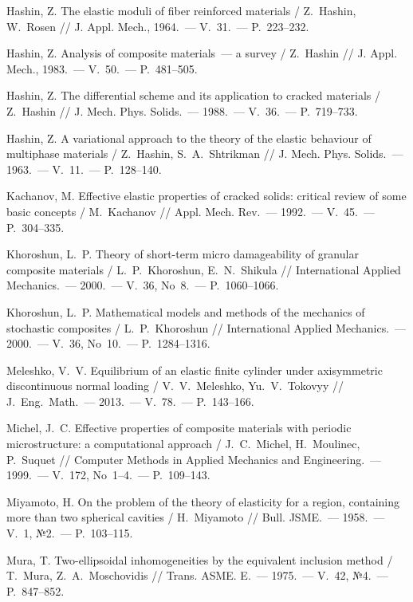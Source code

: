 \begin{biblist}{99}
Hashin, Z. 
The elastic moduli of fiber reinforced materials 
/ Z.~Hashin, W.~Rosen 
// J. Appl. Mech., 1964.~--- V.~31.~--- P.~223--232.

Hashin, Z. 
Analysis of composite materials~--- a survey 
/ Z.~Hashin 
// J. Appl. Mech., 1983.~--- V.~50.~--- P.~481--505.

Hashin, Z. 
The differential scheme and its application to cracked materials  
/ Z.~Hashin 
// J. Mech. Phys. Solids.~--- 1988.~--- V.~36.~--- P.~719--733.

Hashin, Z. 
A variational approach to the theory of the elastic behaviour of multiphase materials    
/ Z.~Hashin, S.~A.~Shtrikman 
// J. Mech. Phys. Solids.~--- 1963.~--- V.~11.~--- P.~128--140.

Kachanov, M. 
Effective elastic properties of cracked solids: critical review of some basic concepts   
/ M.~Kachanov 
// Appl. Mech. Rev.~--- 1992.~--- V.~45.~--- P.~304--335.

Khoroshun, L.~P. 
Theory of short-term micro damageability of granular composite materials
/ L.~P.~Khoroshun, E.~N.~Shikula 
// International Applied Mechanics.~--- 2000.~--- V.~36, No~8.~--- P.~1060--1066.

Khoroshun, L.~P. 
Mathematical models and methods of the mechanics of stochastic composites 
/ L.~P.~Khoroshun 
// International Applied Mechanics.~--- 2000.~--- V.~36, No~10.~--- P.~1284--1316.

Meleshko, V.~V. 
Equilibrium of an elastic finite cylinder under axisymmetric discontinuous normal loading 
/ V.~V.~Meleshko, Yu.~V.~Tokovyy 
// J.~Eng.~Math.~--- 2013.~--- V.~78.~--- P.~143--166.  

Michel, J.~C. 
Effective properties of composite materials with periodic microstructure: a computational approach 
/ J.~C.~Michel, H.~Moulinec, P.~Suquet 
// Computer Methods in Applied Mechanics and Engineering.~--- 1999.~--- V.~172, No~1--4.~--- P.~109--143.

Miyamoto, H. 
On the problem of the theory of elasticity for a region, containing more than two spherical cavities 
/ H.~Miyamoto 
// Bull. JSME.~--- 1958.~--- V.~1, №2.~--- P.~103--115.

Mura, T. 
Two-ellipsoidal inhomogeneities by the equivalent inclusion method 
/ T.~Mura, Z.~A.~Moschovidis 
// Trans. ASME. E.~--- 1975.~--- V.~42, №4.~--- P.~847--852.


\end{biblist}
